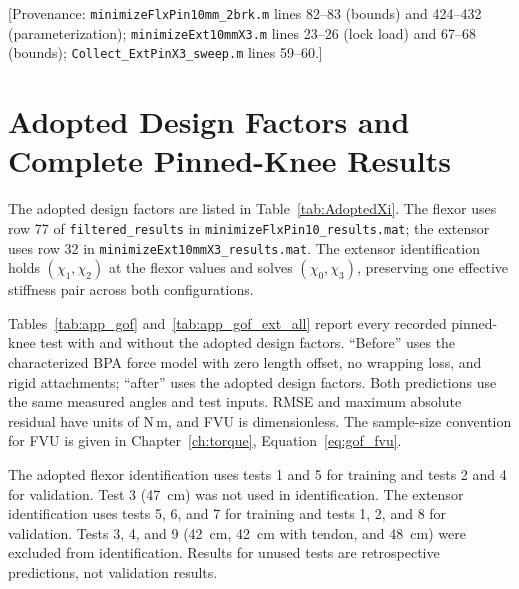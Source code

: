 [Provenance: \nolinkurl{minimizeFlxPin10mm_2brk.m} lines 82--83 (bounds) and 424--432 (parameterization); \nolinkurl{minimizeExt10mmX3.m} lines 23--26 (lock load) and 67--68 (bounds); \nolinkurl{Collect_ExtPinX3_sweep.m} lines 59--60.]

\section{Adopted Design Factors and Complete Pinned-Knee Results}

The adopted design factors are listed in Table~\ref{tab:AdoptedXi}. The flexor uses row 77 of \texttt{filtered\_results} in \nolinkurl{minimizeFlxPin10_results.mat}; the extensor uses row 32 in \nolinkurl{minimizeExt10mmX3_results.mat}. The extensor identification holds $(\chi_1,\chi_2)$ at the flexor values and solves $(\chi_0,\chi_3)$, preserving one effective stiffness pair across both configurations.

Tables~\ref{tab:app_gof} and~\ref{tab:app_gof_ext_all} report every recorded pinned-knee test with and without the adopted design factors. ``Before'' uses the characterized BPA force model with zero length offset, no wrapping loss, and rigid attachments; ``after'' uses the adopted design factors. Both predictions use the same measured angles and test inputs. RMSE and maximum absolute residual have units of N\,m, and FVU is dimensionless. The sample-size convention for FVU is given in Chapter~\ref{ch:torque}, Equation~\eqref{eq:gof_fvu}.

The adopted flexor identification uses tests 1 and 5 for training and tests 2 and 4 for validation. Test 3 (\qty{47}{\cm}) was not used in identification. The extensor identification uses tests 5, 6, and 7 for training and tests 1, 2, and 8 for validation. Tests 3, 4, and 9 (\qty{42}{\cm}, \qty{42}{\cm} with tendon, and \qty{48}{\cm}) were excluded from identification. Results for unused tests are retrospective predictions, not validation results.

